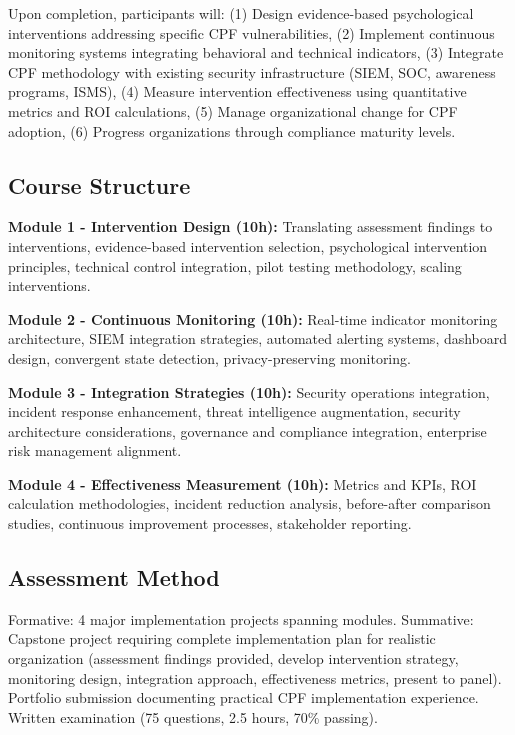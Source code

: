 \documentclass[11pt,a4paper]{article}
\begin{document}
Upon completion, participants will: (1) Design evidence-based psychological interventions addressing specific CPF vulnerabilities, (2) Implement continuous monitoring systems integrating behavioral and technical indicators, (3) Integrate CPF methodology with existing security infrastructure (SIEM, SOC, awareness programs, ISMS), (4) Measure intervention effectiveness using quantitative metrics and ROI calculations, (5) Manage organizational change for CPF adoption, (6) Progress organizations through compliance maturity levels.

\subsection{Course Structure}

\textbf{Module 1 - Intervention Design (10h):} Translating assessment findings to interventions, evidence-based intervention selection, psychological intervention principles, technical control integration, pilot testing methodology, scaling interventions.

\textbf{Module 2 - Continuous Monitoring (10h):} Real-time indicator monitoring architecture, SIEM integration strategies, automated alerting systems, dashboard design, convergent state detection, privacy-preserving monitoring.

\textbf{Module 3 - Integration Strategies (10h):} Security operations integration, incident response enhancement, threat intelligence augmentation, security architecture considerations, governance and compliance integration, enterprise risk management alignment.

\textbf{Module 4 - Effectiveness Measurement (10h):} Metrics and KPIs, ROI calculation methodologies, incident reduction analysis, before-after comparison studies, continuous improvement processes, stakeholder reporting.

\subsection{Assessment Method}

Formative: 4 major implementation projects spanning modules. Summative: Capstone project requiring complete implementation plan for realistic organization (assessment findings provided, develop intervention strategy, monitoring design, integration approach, effectiveness metrics, present to panel). Portfolio submission documenting practical CPF implementation experience. Written examination (75 questions, 2.5 hours, 70\% passing).
\end{document}
